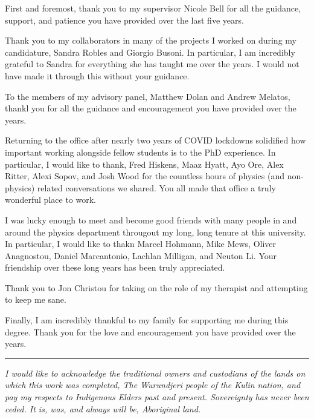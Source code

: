 \begin{acknowledgements}

  First and foremost, thank you to my supervisor Nicole Bell for all the guidance, support, and patience you have provided over the last five years. 

  Thank you to my collaborators in many of the projects I worked on during my candidature, Sandra Robles and Giorgio Busoni. 
  In particular, I am incredibly grateful to Sandra for everything she has taught me over the years. I would not have made it through this without your guidance. 

  To the members of my advisory panel, Matthew Dolan and Andrew Melatos, thankl you for all the guidance and encouragement you have provided over the years.

  Returning to the office after nearly two years of COVID lockdowns solidified how important working alongside fellow students is to the PhD experience. In particular, I would like to thank, Fred Hiskens, Maaz Hyatt, Ayo Ore, Alex Ritter, Alexi Sopov, and Josh Wood for the countless hours of physics (and non-physics) related conversations we shared. You all made that office a truly wonderful place to work.
 
  I was lucky enough to meet and become good friends with many people in and around the physics department througout my long, long tenure at this university. In particular, I would like to thakn Marcel Hohmann, Mike Mews, Oliver Anagnostou, Daniel Marcantonio, Lachlan Milligan, and Neuton Li. Your friendship over these long years has been truly appreciated.

  Thank you to Jon Christou for taking on the role of my therapist and attempting to keep me sane. 

  Finally, I am incredibly thankful to my family for supporting me during this degree. Thank you for the love and encouragement you have provided over the years. 

  \vfill
  \noindent\rule{\textwidth}{0.5pt}
  \textit{I would like to acknowledge the traditional owners and custodians of the lands on which this work was completed, The Wurundjeri people of the Kulin nation, and pay my respects to Indigenous Elders past and present. Sovereignty has never been ceded. It is, was, and always will be, Aboriginal land.}
\end{acknowledgements}
